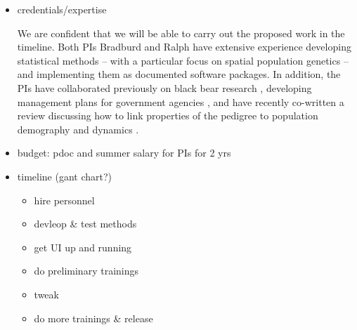 \documentclass[12pt]{article}
\begin{document}
\begin{itemize}
\item credentials/expertise 

We are confident that we will be able to 
carry out the proposed work in the timeline.
Both PIs Bradburd and Ralph have extensive 
experience developing statistical methods -- 
with a particular focus on spatial population genetics -- 
and implementing them as documented software packages.
In addition, the PIs have collaborated previously 
on black bear research \citep{bradburd2018inferring},
developing management plans 
for government agencies \citep{shaffer2017desert},
and have recently co-written a review discussing how to link properties of the pedigree
to population demography and dynamics \citep{bradburd2019spatial}.

\item budget: pdoc and summer salary for PIs for 2 yrs
\item timeline (gant chart?)
\begin{itemize}
\item hire personnel
\item devleop \& test methods
\item get UI up and running
\item do preliminary trainings
\item tweak
\item do more trainings \& release
\end{itemize}
\end{itemize}

\clearpage

\end{document}
